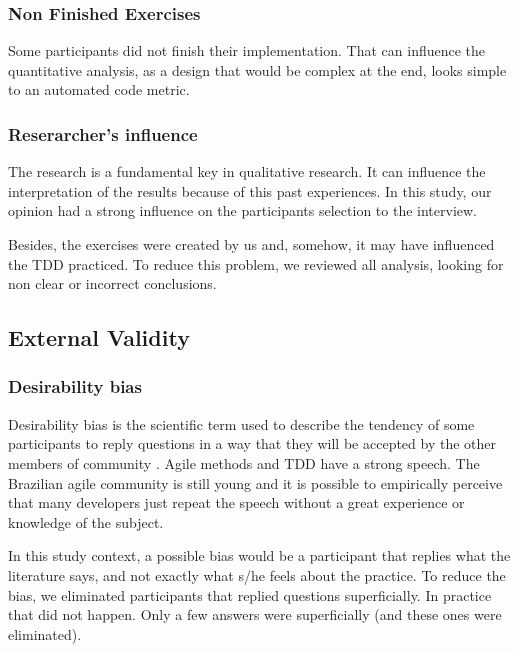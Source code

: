 \documentclass[conference]{IEEEtran}
\begin{document}
\subsubsection{Non Finished Exercises}

Some participants did not finish their implementation. That can influence the
quantitative analysis, as a design that would be complex at the end, looks simple
to an automated code metric.

\subsubsection{Reserarcher's influence}

The research is a fundamental key in qualitative research. It can influence
the interpretation of the results because of this past experiences.
In this study, our opinion had a strong influence on the participants selection
to the interview.

Besides, the exercises were created by us and, somehow, it may have influenced
the TDD practiced. To reduce this problem, we reviewed all analysis, looking for
non clear or incorrect conclusions.


\subsection{External Validity}

\subsubsection{Desirability bias}

Desirability bias is the scientific term used to describe the tendency of some participants
to reply questions in a way that they will be accepted by the other members
of community \cite{crowne}.
Agile methods and TDD have a strong speech. The Brazilian agile community is still
young and it is possible to empirically perceive that many developers just
repeat the speech without a great experience or knowledge of the subject.

In this study context, a possible bias would be a participant that replies
what the literature says, and not exactly what s/he feels about the practice.
To reduce the bias, we eliminated participants that replied questions superficially.
In practice that did not happen. Only a few answers were superficially (and these
ones were eliminated).
\end{document}
